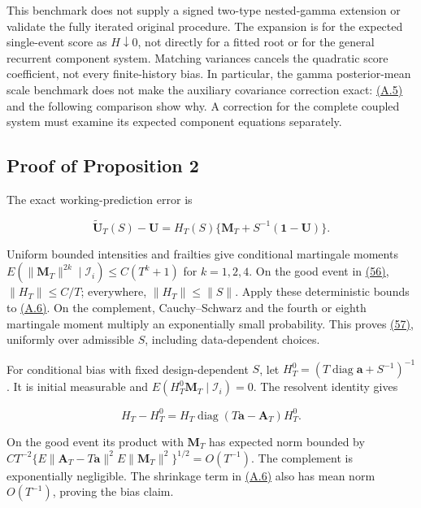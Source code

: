 \documentclass[11pt]{article}
\begin{document}
This benchmark does not supply a signed two-type nested-gamma extension or validate the fully iterated original procedure. The expansion is for the expected single-event score as \(H\downarrow0\), not directly for a fitted root or for the general recurrent component system. Matching variances cancels the quadratic score coefficient, not every finite-history bias. In particular, the gamma posterior-mean scale benchmark does not make the auxiliary covariance correction exact: \hyperref[eq:A.5]{(A.5)} and the following comparison show why. A correction for the complete coupled system must examine its expected component equations separately.

\subsection{Proof of Proposition 2}\label{sec:A.2}

The exact working-prediction error is

\begin{equation*}
\widetilde{\mathbf U}_T(S)-\mathbf U
=H_T(S)\{\mathbf M_T+S^{-1}(\mathbf1-\mathbf U)\}.
\tag{A.6}\label{eq:A.6}
\end{equation*}

Uniform bounded intensities and frailties give conditional martingale moments
\(E(\|\mathbf M_T\|^{2k}\mid\mathcal I_i)\leq C(T^k+1)\) for \(k=1,2,4\).
On the good event in \hyperref[eq:56]{(56)}, \(\|H_T\|\leq C/T\); everywhere,
\(\|H_T\|\leq\|S\|\). Apply these deterministic bounds to \hyperref[eq:A.6]{(A.6)}. On the complement, Cauchy--Schwarz and the fourth or eighth martingale moment multiply an exponentially small probability. This proves \hyperref[eq:57]{(57)}, uniformly over admissible \(S\), including data-dependent choices.

For conditional bias with fixed design-dependent \(S\), let
\(H_T^0=(T\operatorname{diag}\mathbf a+S^{-1})^{-1}\).
It is initial measurable and \(E(H_T^0\mathbf M_T\mid\mathcal I_i)=0\). The resolvent identity gives

\begin{equation*}
H_T-H_T^0=H_T\operatorname{diag}(T\mathbf a-\mathbf A_T)H_T^0.
\tag{A.7}\label{eq:A.7}
\end{equation*}

On the good event its product with \(\mathbf M_T\) has expected norm bounded by
\(CT^{-2}\{E\|\mathbf A_T-T\mathbf a\|^2 E\|\mathbf M_T\|^2\}^{1/2}=O(T^{-1})\).
The complement is exponentially negligible. The shrinkage term in \hyperref[eq:A.6]{(A.6)} also has mean norm \(O(T^{-1})\), proving the bias claim.
\end{document}
